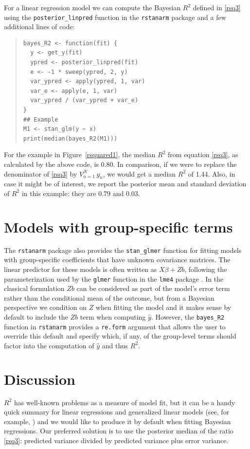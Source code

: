 \documentclass[11pt]{article}
\begin{document}
For a linear regression model we can compute the Bayesian $R^2$ defined in
\eqref{rsq3} using the \verb#posterior_linpred# function in the {\tt rstanarm}
package and a few additional lines of code:
%
\vspace{-\baselineskip}
\begin{quotation}
\noindent
\begin{small}
\begin{verbatim}
bayes_R2 <- function(fit) {
  y <- get_y(fit)
  ypred <- posterior_linpred(fit)
  e <- -1 * sweep(ypred, 2, y)
  var_ypred <- apply(ypred, 1, var)
  var_e <- apply(e, 1, var)
  var_ypred / (var_ypred + var_e)
}
## Example
M1 <- stan_glm(y ~ x)
print(median(bayes_R2(M1)))
\end{verbatim}
\end{small}
\end{quotation}
%
For the example in Figure~\ref{rsquared1}, the median $R^2$ from
equation \eqref{rsq3}, as calculated by the above code, is 0.80.  In comparison,
if we were to replace the denominator of \eqref{rsq3} by $V_{n=1}^N \,y_n$, we
would get a median $R^2$ of 1.44.  Also, in case it might be of interest, we
report the posterior mean and standard deviation of $R^2$ in this example:
they are 0.79 and 0.03.

\section{Models with group-specific terms}
The {\tt rstanarm} package also provides the \verb#stan_glmer# function for
fitting models with group-specific coefficients that have unknown covariance
matrices. The linear predictor for these models is often written as
$X \beta + Zb$, following the parameterization used by the \verb#glmer#
function in the {\tt lme4} package \citep{lme4Rpackage}. In the classical
formulation $Zb$ can be considered as part of the model's error term rather than
the conditional mean of the outcome, but from a Bayesian perspective we
condition on $Z$ when fitting the model and it makes sense by default to include
the $Zb$ term when computing $\hat{y}$. However, the \verb#bayes_R2# function in
{\tt rstanarm} provides a {\tt re.form} argument that allows the user to
override this default and specify which, if any, of the group-level terms should
factor into the computation of $\hat{y}$ and thus $R^2$.

\section{Discussion}
$R^2$ has well-known problems as a measure of model fit, but it can be a handy
quick summary for linear regressions and generalized linear models (see, for
example, \cite{HuPaltaShao2006}) and we would like to produce it by default
when fitting Bayesian regressions.  Our preferred solution is to use the
posterior median of the ratio \eqref{rsq3}:  predicted variance divided by
predicted variance plus error variance.
\end{document}
